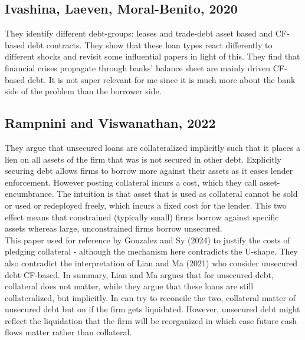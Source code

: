 \documentclass[12pt]{article}
\begin{document}
\subsection*{Ivashina, Laeven, Moral-Benito, 2020}
They identify different debt-groups: leases and trade-debt asset based and CF-based debt contracts. They show that these loan types react differently to different shocks and revisit some influential papers in light of this. They find that financial crises propagate through banks' balance sheet are mainly driven CF-based debt. It is not super relevant for me since it is much more about the bank side of the problem than the borrower side. 

\subsection*{Rampnini and Viswanathan, 2022}
They argue that unsecured loans are collateralized implicitly such that it places a lien on all assets of the firm that was is not secured in other debt. Explicitly securing debt allows firms to borrow more against their assets as it eases lender enforcement. However posting collateral incurs a cost, which they call asset-encumbrance. The intuition is that asset that is used as collateral cannot be sold or used or redeployed freely, which incurs a fixed cost for the lender. This two effect means that constrained (typically small) firms borrow against specific assets whereas large, unconstrained firms borrow unsecured. \vspace*{3mm} \\ 
This paper used for reference by Gonzalez and Sy (2024) to justify the costs of pledging collateral - although the mechanism here contradicts the U-shape. They also contradict the interpretation of Lian and Ma (2021) who consider unsecured debt CF-based. In summary, Lian and Ma argues that for unsecured debt, collateral does not matter, while they argue that these loans are still collateralized, but implicitly. In can try to reconcile the two, collateral matter of unsecured debt but on if the firm gets liquidated. However, unsecured debt might reflect the liquidation that the firm will be reorganized in which case future cash flows matter rather than collateral. 
\end{document}
